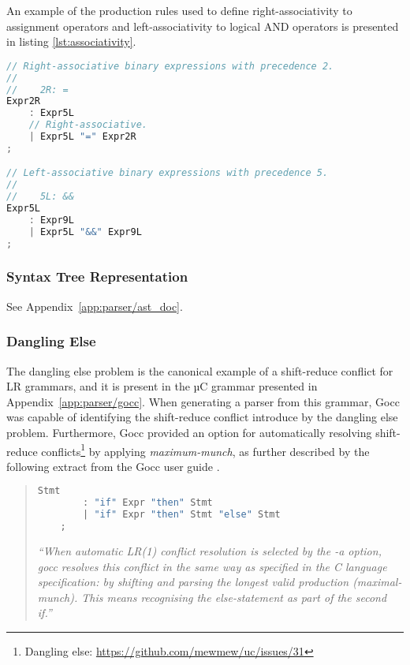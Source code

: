 An example of the production rules used to define right-associativity to assignment operators and left-associativity to logical AND operators is presented in listing \ref{lst:associativity}.

\begin{lstlisting}[language=go,style=go,caption={\label{lst:associativity}Associativity of binary expressions.}]
// Right-associative binary expressions with precedence 2.
//
//    2R: =
Expr2R
	: Expr5L
	// Right-associative.
	| Expr5L "=" Expr2R
;

// Left-associative binary expressions with precedence 5.
//
//    5L: &&
Expr5L
	: Expr9L
	| Expr5L "&&" Expr9L
;
\end{lstlisting}

\subsubsection{Syntax Tree Representation}

See Appendix~\ref{app:parser/ast_doc}.

\subsubsection{Dangling Else}

The dangling else problem is the canonical example of a shift-reduce conflict for LR grammars, and it is present in the µC grammar presented in Appendix~\ref{app:parser/gocc}. When generating a parser from this grammar, Gocc was capable of identifying the shift-reduce conflict introduce by the dangling else problem. Furthermore, Gocc provided an option for automatically resolving shift-reduce conflicts\footnote{Dangling else: \url{https://github.com/mewmew/uc/issues/31}} by applying \textit{maximum-munch}, as further described by the following extract from the Gocc user guide \cite{gocc_user_guide}.

\begin{quote}
	\begin{lstlisting}[language=go,style=go,caption={Grammar with shift-reduce conflict.}]
	Stmt
		: "if" Expr "then" Stmt
		| "if" Expr "then" Stmt "else" Stmt
	;
	\end{lstlisting}

	\textit{``When automatic LR(1) conflict resolution is selected by the -a option, gocc resolves this conflict in the same way as specified in the C language specification: by shifting and parsing the longest valid production (maximal-munch). This means recognising the else-statement as part of the second if.''}
\end{quote}
